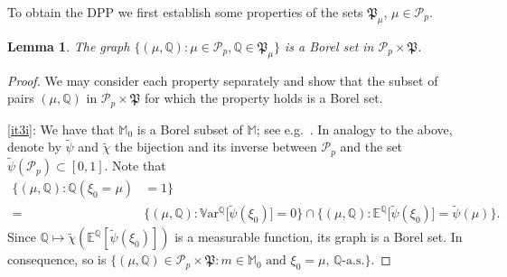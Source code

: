 \documentclass{article}
\newtheorem{lemma}[theorem]{Lemma}
\theoremstyle{definition}
\numberwithin{equation}{section}
\numberwithin{theorem}{section}
\newcommand{\E}{\mathbb{E}}
\newcommand{\Pp}{\mathbb{Q}}
\newcommand{\Mb}{\mathbb{M}}
\newcommand{\Pc}{\mathcal{P}}
\newcommand{\Var}{\mathbb{V}\mathrm{ar}}
\newcommand{\Pk}{\mathfrak{P}}
\begin{document}
\begin{appendix}
	
	To obtain the DPP we first establish some properties of the sets $\Pk_\mu$, $\mu\in\Pc_p$.


	\begin{lemma}\label{lem:analytic}
The graph $\{(\mu,\Pp):\mu\in\Pc_p,\Pp\in\Pk_\mu\}$ is a Borel set in $\Pc_p\times\Pk$. 
	\end{lemma} 
	
	\begin{proof}
		We may consider each property separately and show that the subset of pairs $(\mu,\Pp)$ in $\Pc_p\times\Pk$ for which the property holds is a Borel set. 
		
		\ref{it3i}:
		We have that $\Mb_0$ is a Borel subset of $\Mb$; see e.g.\ \cite[Appendix]{karoui_nguyen_jeanblanc}.
		In analogy to the above, denote by $\tilde\psi$ and $\tilde\chi$ the bijection and its inverse between $\Pc_p$ and the set $\tilde\psi(\Pc_p)\subset[0,1]$. Note that 
		\begin{align*}
			\{(\mu,\Pp) \colon \Pp(\xi_0=\mu) & =1\}\\
			=&
			\big\{(\mu,\Pp): \Var^\Pp\big[\tilde\psi(\xi_0)\big]=0 %
			\big\}
			\cap\big\{(\mu,\Pp): \E^\Pp\big[\tilde\psi(\xi_0)\big]=\tilde\psi(\mu)\big\}.
		\end{align*}
		Since $\Pp\mapsto\tilde\chi(\E^\Pp[\tilde\psi(\xi_0)])$ is a measurable function, its graph is a Borel set.
		In consequence, so is $\{(\mu,\Pp)\in\Pc_p\times\Pk:\textrm{$m\in\Mb_0$ and $\xi_0=\mu$, $\Pp$-a.s.}\}$. 
		

\end{proof}
\end{appendix}
\end{document}
